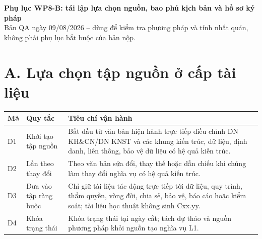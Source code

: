 \documentclass[10pt]{article}
\newcommand{\smallhead}[1]{\textbf{#1}}
\begin{document}
\begin{center}
{\Large\bfseries Phụ lục WP8-B: tái lập lựa chọn nguồn, bao phủ kịch bản và hồ sơ ký pháp}\\[2pt]
{\small Bản QA ngày 09/08/2026 -- dùng để kiểm tra phương pháp và tính nhất quán, không phải phụ lục bắt buộc của bản nộp.}
\end{center}

\section*{A. Lựa chọn tập nguồn ở cấp tài liệu}
\begin{tabularx}{\textwidth}{@{}p{1.1cm}p{4.0cm}Y@{}}
\toprule
\smallhead{Mã} & \smallhead{Quy tắc} & \smallhead{Tiêu chí vận hành} \\
\midrule
D1 & Khởi tạo tập nguồn & Bắt đầu từ văn bản hiện hành trực tiếp điều chỉnh DN KH\&CN/DN KNST và các khung kiến trúc, dữ liệu, định danh, liên thông, bảo vệ dữ liệu có hệ quả kiến trúc. \\
D2 & Lần theo thay đổi & Theo văn bản sửa đổi, thay thế hoặc dẫn chiếu khi chúng làm thay đổi nghĩa vụ có hệ quả kiến trúc. \\
D3 & Đưa vào tập ràng buộc & Chỉ giữ tài liệu tác động trực tiếp tới dữ liệu, quy trình, thẩm quyền, vòng đời, chia sẻ, bảo vệ, báo cáo hoặc kiểm soát; tài liệu học thuật không sinh Cxx.yy. \\
D4 & Khóa trạng thái & Khóa trạng thái tại ngày cắt; tách dự thảo và nguồn phương pháp khỏi nguồn tạo nghĩa vụ L1. \\
\bottomrule
\end{tabularx}
\end{document}
